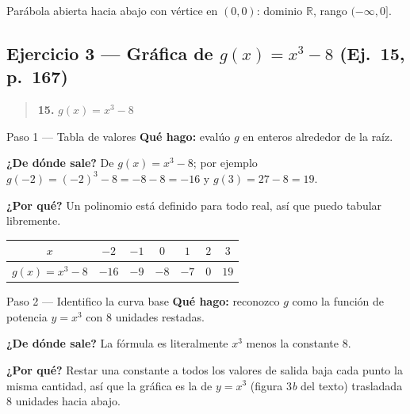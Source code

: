\documentclass[11pt]{article}
\begin{document}
\begin{resp}
Parábola abierta hacia abajo con vértice en $(0,0)$: dominio $\mathbb{R}$, rango $(-\infty,0]$.
\end{resp}

\subsection*{Ejercicio 3 — Gráfica de $g(x)=x^3-8$ (Ej.~15, p.~167)}

\begin{quote}
\textbf{15.} $g(x)=x^3-8$
\end{quote}

\begin{paso}{Paso 1 --- Tabla de valores}
\textbf{Qué hago:} evalúo $g$ en enteros alrededor de la raíz.

\textbf{¿De dónde sale?} De $g(x)=x^3-8$; por ejemplo $g(-2)=(-2)^3-8=-8-8=-16$ y $g(3)=27-8=19$.

\textbf{¿Por qué?} Un polinomio está definido para todo real, así que puedo tabular libremente.

\begin{center}
\begin{tabular}{|c|c|c|c|c|c|c|}
\hline
$x$ & $-2$ & $-1$ & $0$ & $1$ & $2$ & $3$\\\hline
$g(x)=x^3-8$ & $-16$ & $-9$ & $-8$ & $-7$ & $0$ & $19$\\\hline
\end{tabular}
\end{center}
\end{paso}

\begin{paso}{Paso 2 --- Identifico la curva base}
\textbf{Qué hago:} reconozco $g$ como la función de potencia $y=x^3$ con $8$ unidades restadas.

\textbf{¿De dónde sale?} La fórmula es literalmente $x^3$ menos la constante $8$.

\textbf{¿Por qué?} Restar una constante a todos los valores de salida baja cada punto la misma cantidad, así que la gráfica es la de $y=x^3$ (figura 3\textit{b} del texto) trasladada $8$ unidades hacia abajo.
\end{paso}
\end{document}
